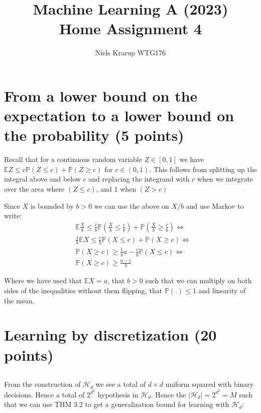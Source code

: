 \documentclass[a4paper,12pt]{article}
\begin{document}
\title{Machine Learning A (2023)\\Home Assignment 4}
\author{\color{red}Niels Krarup WTG176}
\date{}
\maketitle

\tableofcontents %
\newpage %

\section{From a lower bound on the expectation to a lower bound on the probability (5 points)}

Recall that for a continuous random variable $Z \in [0,1]$ we have 
$\mathbb{E}Z \leq c\mathbb{P}(Z \leq c)	+ \mathbb{P}(Z \geq c)$ for $c \in (0,1)$. This follows from splitting up the integral above and below $c$ and replacing the integrand with $c$ when we integrate over the area where $(Z \leq c)$, and $1$ when $(Z > c)$

Since $X$ is bounded by $b>0$ we can use the above on $X/b$ and use Markov to write:
\begin{align*}
&\mathbb{E}\frac{X}{b} \leq \frac{c}{b}\mathbb{P} \left(\frac{X}{b} \leq \frac{c}{b}\right) + \mathbb{P}\left( \frac{X}{b} \geq \frac{c}{b} \right) 
\Leftrightarrow \\
&\frac{1}{b}\mathbb{E}X \leq \frac{c}{b} \mathbb{P} \left(X \leq c\right) + \mathbb{P}\left( X \geq c \right) \Leftrightarrow \\
&\mathbb{P}\left( X \geq c \right) \geq \frac{1}{b}a - \frac{c}{b} \mathbb{P} \left(X \leq c\right)  \Leftrightarrow \\
&\mathbb{P}\left( X \geq c \right) \geq \frac{a-c}{b}
\end{align*}

Where we have used that $\mathbb{E}X = a$, that $b >0$ such that we can multiply on both sides of the inequalities without them flipping, that $\mathbb{P}(.) \leq 1$ and linearity of the mean.

\section{Learning by discretization (20 points)}

\subsection{} %
From the construction of $\mathcal{H}_d$ we see a total of $d \times d$ uniform squared with binary decisions. Hence a total of $2^{d^2}$ hypothesis in  $\mathcal{H}_d$. Hence the $|\mathcal{H}_d| = 2^{d^2} = M$ such that we can use THM 3.2 to get a generalization bound for learning with  $\mathcal{H}_d$:
\end{document}
